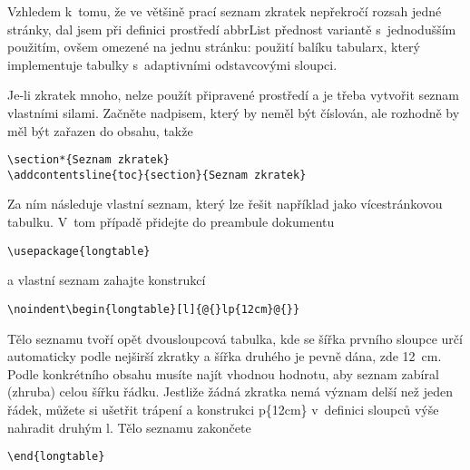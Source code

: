 \documentclass[FM,BP]{tulthesis}
\newcommand{\argument}[1]{{\ttfamily\color{\tulcolor}#1}}
\newenvironment{myquote}{\begin{list}{}{\setlength\leftmargin\parindent}\item[]}{\end{list}}
\newenvironment{listing}{\begin{myquote}\color{\tulcolor}}{\end{myquote}}
\begin{document}
Vzhledem k~tomu, že ve většině prací seznam zkratek nepřekročí rozsah jedné
stránky, dal jsem při definici prostředí \argument{abbrList} přednost variantě
s~jednodušším použitím, ovšem omezené na jednu stránku: použití balíku
\argument{tabularx}, který implementuje tabulky s~adaptivními odstavcovými
sloupci.

Je-li zkratek mnoho, nelze použít připravené prostředí a je třeba vytvořit
seznam vlastními silami. Začněte nadpisem, který by neměl být číslován, ale
rozhodně by měl být zařazen do obsahu, takže

\begin{listing}
\begin{verbatim}
\section*{Seznam zkratek}
\addcontentsline{toc}{section}{Seznam zkratek}
\end{verbatim}
\end{listing}

Za ním následuje vlastní seznam, který lze řešit například jako vícestránkovou
tabulku. V~tom případě přidejte do preambule dokumentu

\begin{listing}
\begin{verbatim}
\usepackage{longtable}
\end{verbatim}
\end{listing}

a vlastní seznam zahajte konstrukcí

\begin{listing}
\begin{verbatim}
\noindent\begin{longtable}[l]{@{}lp{12cm}@{}}
\end{verbatim}
\end{listing}

Tělo seznamu tvoří opět dvousloupcová tabulka, kde se šířka prvního sloupce
určí automaticky podle nejširší zkratky a šířka druhého je pevně dána, zde
12~cm. Podle konkrétního obsahu musíte najít vhodnou hodnotu, aby seznam
zabíral (zhruba) celou šířku řádku. Jestliže žádná zkratka nemá význam delší
než jeden řádek, můžete si ušetřit trápení a konstrukci \argument{p\{12cm\}}
v~definici sloupců výše nahradit druhým \argument{l}. Tělo seznamu zakončete

\begin{listing}
\begin{verbatim}
\end{longtable}
\end{verbatim}
\end{listing}
\end{document}
